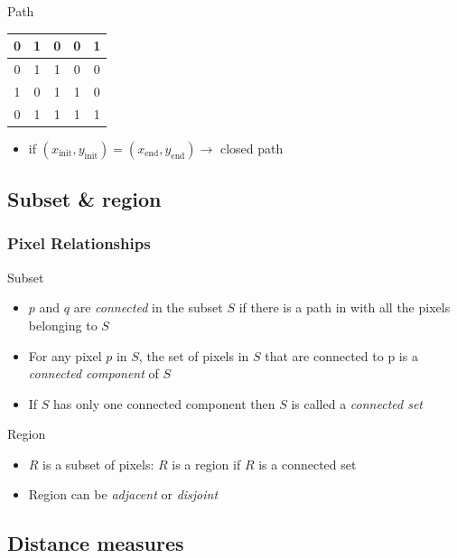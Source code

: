 \documentclass[table]{beamer}
\begin{document}
\begin{frame}
\begin{block}{Path}
\begin{center}
{\begin{tabular}{|c|c|c|c|c|}
      0 & \cellcolor{orounam!50}1 & 0 & 0 & 1\\ \hline
      0 & \cellcolor{orounam!50}1 & \cellcolor{orounam!50}1 & 0 & 0\\ \hline
      1 & 0 & \cellcolor{orounam!50}1 & 1 & 0\\ \hline
      0 & 1 & \cellcolor{orounam!50}1 & \cellcolor{orounam!50}1 & \cellcolor{azulunam!50}1\\ \hline
    \end{tabular}
  \begin{itemize}
    \item if $(x_{\text{init}}, y_{\text{init}}) = (x_{\text{end}}, y_{\text{end}}) \rightarrow$ closed path 
  \end{itemize}}
  \end{center}
  \end{block}
\end{frame}

\subsection{Subset \& region}

\begin{frame}
  \frametitle{Pixel Relationships}
  \begin{block}{Subset}
    \begin{itemize}
    \item $p$ and $q$ are \emph{connected} in the subset $S$ if there is a path in with all the pixels belonging to $S$
    \item For any pixel $p$ in $S$, the set of pixels in $S$ that are connected to p is a \emph{connected component} of $S$
    \item If $S$ has only one connected component then $S$ is called a \emph{connected set}
    \end{itemize}
  \end{block}
  \begin{block}{Region}
    \begin{itemize}
    \item $R$ is a subset of pixels: $R$ is a region if $R$ is a connected set
    \item Region can be \emph{adjacent} or \emph{disjoint}
    \end{itemize}
  \end{block}
\end{frame}

\subsection{Distance measures}
\end{document}
